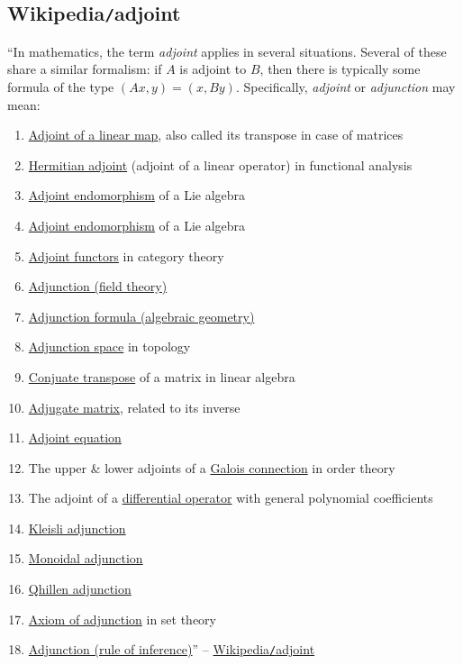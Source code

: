 \documentclass{article}
\begin{document}
\subsection{Wikipedia{\tt/}adjoint}
``In mathematics, the term {\it adjoint} applies in several situations. Several of these share a similar formalism: if $A$ is adjoint to $B$, then there is typically some formula of the type $(Ax,y) = (x,By)$. Specifically, {\it adjoint} or {\it adjunction} may mean:
\begin{enumerate}
	\item \href{https://en.wikipedia.org/wiki/Transpose_of_a_linear_map}{Adjoint of a linear map}, also called its transpose in case of matrices
	\item \href{https://en.wikipedia.org/wiki/Hermitian_adjoint}{Hermitian adjoint} (adjoint of a linear operator) in functional analysis
	\item \href{https://en.wikipedia.org/wiki/Adjoint_endomorphism}{Adjoint endomorphism} of a Lie algebra
	\item \href{https://en.wikipedia.org/wiki/Adjoint_endomorphism}{Adjoint endomorphism} of a Lie algebra
	\item \href{https://en.wikipedia.org/wiki/Adjoint_representation_of_a_Lie_group}{Adjoint functors} in category theory
	\item \href{https://en.wikipedia.org/wiki/Adjunction_(field_theory)}{Adjunction (field theory)}
	\item \href{https://en.wikipedia.org/wiki/Adjunction_formula_(algebraic_geometry)}{Adjunction formula (algebraic geometry)}
	\item \href{https://en.wikipedia.org/wiki/Adjunction_space}{Adjunction space} in topology
	\item \href{https://en.wikipedia.org/wiki/Conjugate_transpose}{Conjuate transpose} of a matrix in linear algebra
	\item \href{https://en.wikipedia.org/wiki/Adjugate_matrix}{Adjugate matrix}, related to its inverse
	\item \href{https://en.wikipedia.org/wiki/Adjoint_equation}{Adjoint equation}
	\item The upper \& lower adjoints of a \href{https://en.wikipedia.org/wiki/Galois_connection}{Galois connection} in order theory
	\item The adjoint of a \href{https://en.wikipedia.org/wiki/Differential_operator}{differential operator} with general polynomial coefficients
	\item \href{https://en.wikipedia.org/wiki/Kleisli_adjunction}{Kleisli adjunction}
	\item \href{https://en.wikipedia.org/wiki/Monoidal_adjunction}{Monoidal adjunction}
	\item \href{https://en.wikipedia.org/wiki/Quillen_adjunction}{Qhillen adjunction}
	\item \href{https://en.wikipedia.org/wiki/Axiom_of_adjunction}{Axiom of adjunction} in set theory
	\item \href{https://en.wikipedia.org/wiki/Adjunction_(rule_of_inference)}{Adjunction (rule of inference)}'' -- \href{https://en.wikipedia.org/wiki/Adjoint}{Wikipedia{\tt/}adjoint}
\end{enumerate}
\end{document}
